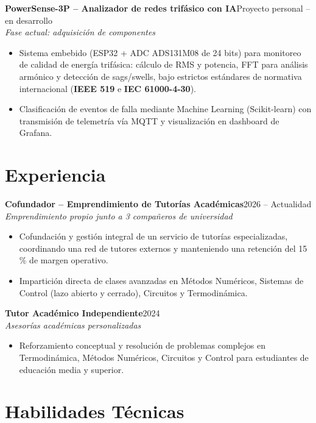 \documentclass[10pt,a4paper]{article}
\newcommand{\entrada}[3]{%
    \noindent\textbf{\color{primario}#1}\hfill{\small\color{secundario}#2}\\[0pt]
    {\small\itshape\color{secundario}#3}\par\vspace{1pt}%
}
\begin{document}
\entrada{PowerSense-3P -- Analizador de redes trifásico con IA}{Proyecto personal -- en desarrollo}{Fase actual: adquisición de componentes}
\begin{itemize}
    \item Sistema embebido (ESP32 + ADC ADS131M08 de 24 bits) para monitoreo de calidad de energía trifásica: cálculo de RMS y potencia, FFT para análisis armónico y detección de sags/swells, bajo estrictos estándares de normativa internacional (\textbf{IEEE 519} e \textbf{IEC 61000-4-30}).
    \item Clasificación de eventos de falla mediante Machine Learning (Scikit-learn) con transmisión de telemetría vía MQTT y visualización en dashboard de Grafana.
\end{itemize}

\section*{Experiencia}

\entrada{Cofundador -- Emprendimiento de Tutorías Académicas}{2026 -- Actualidad}{Emprendimiento propio junto a 3 compañeros de universidad}
\begin{itemize}
    \item Cofundación y gestión integral de un servicio de tutorías especializadas, coordinando una red de tutores externos y manteniendo una retención del 15\,\% de margen operativo.
    \item Impartición directa de clases avanzadas en Métodos Numéricos, Sistemas de Control (lazo abierto y cerrado), Circuitos y Termodinámica.
\end{itemize}
\vspace{1pt}

\entrada{Tutor Académico Independiente}{2024}{Asesorías académicas personalizadas}
\begin{itemize}
    \item Reforzamiento conceptual y resolución de problemas complejos en Termodinámica, Métodos Numéricos, Circuitos y Control para estudiantes de educación media y superior.
\end{itemize}

\section*{Habilidades Técnicas}
\end{document}
